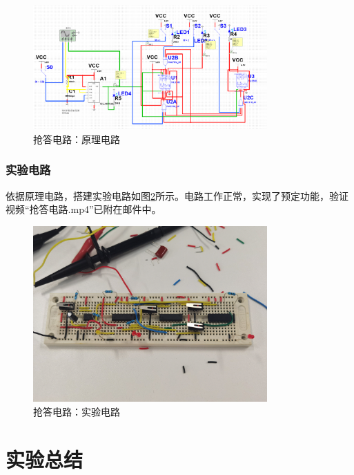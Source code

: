 \documentclass[UTF8]{ctexart}
\numberwithin{figure}{subsection}
\numberwithin{table}{subsection}
\numberwithin{equation}{subsection}
\begin{document}
\begin{figure}[H]
    \begin{center}
        \includegraphics[width=0.8\textwidth]{responder/sim circuit.png}
    \end{center}
    \caption{抢答电路：原理电路}
    \label{responder sim circuit}
\end{figure}

\subsubsection{实验电路}
\par 依据原理电路，搭建实验电路如图\ref{responder exp circuit}所示。电路工作正常，实现了预定功能，验证视频“抢答电路.mp4”已附在邮件中。

\begin{figure}[H]
    \begin{center}
        \includegraphics[width=0.8\textwidth]{responder/circuit.jpg}
    \end{center}
    \caption{抢答电路：实验电路}
    \label{responder exp circuit}
\end{figure}




\section{实验总结}
\end{document}
